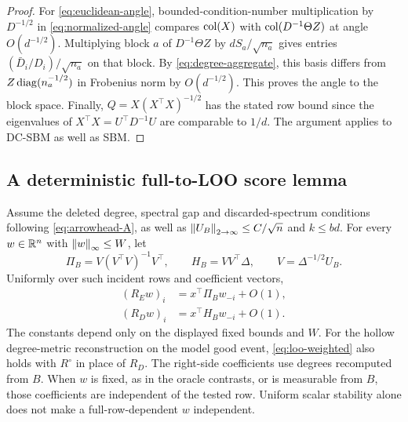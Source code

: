 \begin{proof}
For \eqref{eq:euclidean-angle}, bounded-condition-number multiplication by
$D^{-1/2}$ in \eqref{eq:normalized-angle} compares $\operatorname{col}(X)$ with
$\operatorname{col}(D^{-1}\Theta Z)$ at angle $O(d^{-1/2})$.
Multiplying block $a$ of $D^{-1}\Theta Z$ by $dS_a/\sqrt{n_a}$ gives
entries $(\bar D_i/D_i)/\sqrt{n_a}$ on that block. By
\eqref{eq:degree-aggregate}, this basis differs from
$Z\operatorname{diag}(n_a^{-1/2})$ in Frobenius norm by $O(d^{-1/2})$.
This proves the angle to the block space. Finally,
$Q=X(X^\top X)^{-1/2}$ has the stated row bound since the eigenvalues of
$X^\top X=U^\top D^{-1}U$ are comparable to $1/d$.
The argument applies to DC-SBM as well as SBM.
\end{proof}

\subsection{A deterministic full-to-LOO score lemma}

\begin{lemma}
\label{lem:loo}
Assume the deleted degree, spectral gap and discarded-spectrum conditions
following \eqref{eq:arrowhead-A}, as well as
$\left\lVert U_B\right\rVert_{2\to\infty}\le C/\sqrt n$ and $k\le bd$.
For every $w\in\mathbb R^n$ with $\left\lVert w\right\rVert_\infty\le W$, let
\[
 \Pi_B=V(V^\top V)^{-1}V^\top,
 \qquad H_B=VV^\top\Delta,\qquad V=\Delta^{-1/2}U_B.
\]
Uniformly over such incident rows and coefficient vectors,
\begin{align}
 (R_Ew)_i&=x^\top\Pi_Bw_{-i}+O(1),\label{eq:loo-euclidean}\\
 (R_Dw)_i&=x^\top H_Bw_{-i}+O(1).\label{eq:loo-weighted}
\end{align}
The constants depend only on the displayed fixed bounds and $W$.
For the hollow degree-metric reconstruction on the model good event,
\eqref{eq:loo-weighted} also holds with $R^\circ$ in place of $R_D$.
The right-side coefficients use degrees recomputed from $B$. When $w$
is fixed, as in the oracle contrasts, or is measurable from $B$, those
coefficients are independent of the tested row. Uniform scalar stability
alone does not make a full-row-dependent $w$ independent.
\end{lemma}

